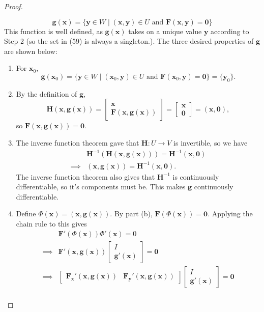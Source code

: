 \documentclass{article}
\newcommand{\x}{\mathbf{x}}
\newcommand{\F}{\mathbf{F}}
\newcommand{\y}{\mathbf{y}}
\newcommand{\g}{\mathbf{g}}
\newcommand{\ze}{\mathbf{0}}
\theoremstyle{definition}
\begin{document}
\begin{proof}
\begin{enumerate}
			\begin{equation}\label{key}
				\g(\x)= \{\y\in W \mid (\x,\y)\in U \text{ and }\F(\x,\y)=\ze \}
			\end{equation} This function is well defined, as $ \g(\x) $ takes on a unique value $ \y $ according to Step 2 (so the set in (59) is always a singleton.). The three desired properties of $ \g $ are shown below:
			\begin{enumerate}
				\item For $ \x_0 $, 
				$$ \g(\x_0) = \{\y\in W \mid (\x_0,\y)\in U \text{ and }\F(\x_0,\y)=\ze \} = \{\y_0\} .$$
				\item By the definition of $ \mathbf g $, 
				$$ \mathbf H(\x,\g(\x)) = \begin{bmatrix}
					\x \\ \F(\x, \g(\x))
				\end{bmatrix} = \begin{bmatrix}
					\x \\ \ze
				\end{bmatrix} = (\x, \ze),$$ so $ \F(\x, \g(\x))=\ze $.
				\item The inverse function theorem gave that $ \mathbf H:U\to V $ is invertible, so we have 
				\begin{align*}
					&\mathbf H^{-1}\left( \mathbf H(\x,\g(\x)) \right)  = \mathbf H^{-1}(\x,\ze)\\ \implies 
					& (\x,\g(\x)) = \mathbf H^{-1}(\x,\ze).
				\end{align*}  
				The inverse function theorem also gives that $ \mathbf H^{-1} $ is continuously differentiable, so it's components must be. This makes $ \g $ continuously differentiable. 
				\item Define $\Phi(\x) = (\x,\g(\x)) $. By part (b), $ \F(\Phi(\x))=\ze $. Applying the chain rule to this gives 
				\begin{align*}
					&		\F'(\Phi(\x))\Phi'(\x)=0\\
					\implies & 	\F'(\x, \g(\x))\begin{bmatrix}
						I \\ \g'(\x)
					\end{bmatrix} = \ze\\
					\implies & 	\begin{bmatrix}
						\F_\x'(\x,\g(\x)) & 	\F_\y'(\x,\g(\x))
					\end{bmatrix}\begin{bmatrix}
						I \\ \g'(\x)
					\end{bmatrix} = \ze\\ 

\end{align*}
\end{enumerate}
\end{enumerate}
\end{proof}
\end{document}

